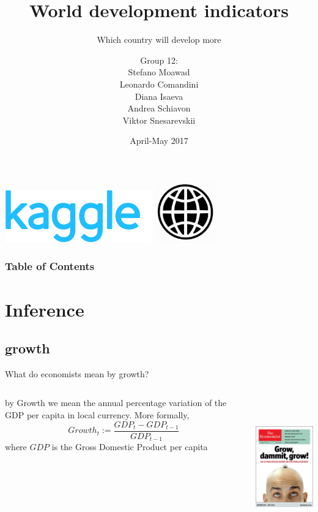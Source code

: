 \documentclass[9pt]{beamer}
\title[World development indicators]{\huge World development indicators}
\subtitle[Which country will develop more]{\large Which country will develop more}
\author[Moawad, Comandini, Isaeva, Schiavon, Snesarevskii] {{\Large Group 12:\\}Stefano Moawad\\Leonardo Comandini\\Diana Isaeva\\Andrea Schiavon\\Viktor Snesarevskii}
\date{April-May 2017}
\begin{document}
	\begin{frame}
	\titlepage
	\vfill
	\begin{flushright}
		\includegraphics[height=.7cm]{kaggle.png}\quad
		\includegraphics[height=.7cm]{worldbank.jpg}
	\end{flushright}
\end{frame}

\begin{frame}
	\frametitle{Table of Contents}
	\tableofcontents
\end{frame}


\section{Inference}

\subsection{growth}


\begin{frame}{What do economists mean by growth?}
	\begin{columns}[T] %
		\begin{column}[T]{5cm} %
		\begin{definition}
		 by \alert{Growth} we mean the annual percentage variation of the GDP per capita in local currency. More formally,
		 \begin{equation}
		 Growth_{t} := \frac{GDP_{t}-GDP_{t-1}}{GDP_{t-1}}
		 \end{equation}
		 where $ GDP $ is the Gross Domestic Product per capita
		\end{definition}	
		\end{column}
		\begin{column}[T]{5cm} %
			\includegraphics[height=6cm]{economist-growth.jpg}
		\end{column}
	\end{columns}
\end{frame}
\end{document}

